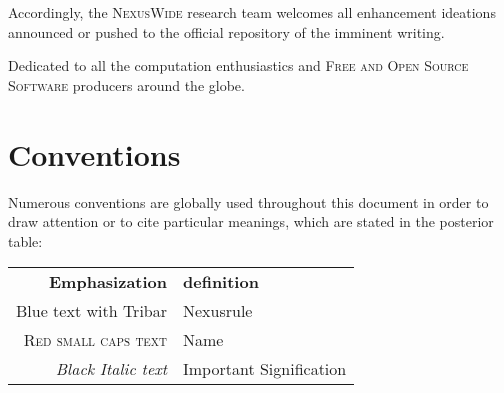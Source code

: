 \documentclass[13pt]{scrarticle}
\newcommand{\header}[1]{\hspace{5.3cm} \textsf{#1} \relax{}}
\newcommand{\important}[1]{\textit{#1}}
\newcommand{\name}[1]{\color{red} {\textsc{#1}}\color{black}}
\newcommand{\nexusrule}[1]{\Tribar[1][white][yellow][red]\color{blue} #1}
\begin{document}
    Accordingly, the \name{NexusWide } research team welcomes all enhancement ideations announced or pushed to the official repository of the imminent writing.
    \newline


    \newpage
    \thispagestyle{empty}



    \begin{centering}
        \vspace*{7cm}
      
        \hspace{1.0cm}
        Dedicated to all the computation enthusiastics \newline
        \hspace*{2.5cm}
        and \newline
        \hspace{0.3cm}
        \name{Free and Open Source Software } producers around the globe.

    \end{centering}


    \newpage
    \thispagestyle{fancy}
    \setcounter{page}{4}


    \tableofcontents


    \newpage
    \thispagestyle{fancy}
    \setcounter{page}{1}

    \section{\header{Conventions}}

    Numerous conventions are globally used throughout this document
    in order to draw attention or to cite particular meanings,
    which are stated in the posterior table:


    \vspace*{2cm}
    \begin{tabular}{r l}

        \hspace{2.8cm}
        \raggedright \textbf{\Large Emphasization} & \textbf{\Large definition} \tabularnewline

        \nexusrule{Blue text with Tribar} & Nexusrule \tabularnewline
        \name{Red small caps text} & Name \tabularnewline
        \important{Black Italic text} & Important Signification

    \end{tabular}
    \vspace*{2cm}
\end{document}
